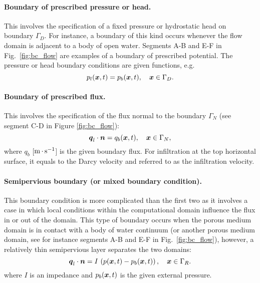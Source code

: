 \paragraph{Boundary of prescribed pressure or head.}
This involves the specification of a fixed pressure or hydrostatic head on boundary $\Gamma_D$.
For instance, a boundary of this kind occurs whenever the flow domain is adjacent to a body of open water.
Segments A-B and E-F in Fig.~\ref{fig:bc_flow} are examples of a boundary of prescribed potential.
The pressure or head boundary conditions are given functions, e.g.
\begin{equation}
\label{eq:BC pressure Darcy PS}
  p_l({\boldsymbol{x}},t) = p_{b}({\boldsymbol{x}},t), \quad {\boldsymbol{x}} \in \Gamma_D. 
\end{equation}

\paragraph{Boundary of prescribed flux.}
This involves the specification of the flux normal to the boundary $\Gamma_N$
(see segment C-D in Figure \ref{fig:bc_flow}):
\begin{equation}
\label{eq:BC flux Darcy PS}
  {\boldsymbol{q}}_l\cdot \boldsymbol{n} = q_{b}({\boldsymbol{x}},t), \quad {\boldsymbol{x}} \in \Gamma_N,
\end{equation}
where $q_b$ [${\rm m}{\,\cdot\,}{\rm s}^{-1}$] is the given boundary flux. 
For infiltration at the top horizontal surface, it equals to the Darcy velocity
and referred to as the infiltration velocity.

\paragraph{Semipervious boundary (or mixed boundary condition).}
This boundary condition is more complicated than the first two as it involves a case 
in which local conditions within the computational domain influence the flux in or 
out of the domain.
This type of boundary occurs when the porous medium domain is in contact with 
a body of water continuum (or another porous medium domain, see for instance segments 
A-B and E-F in Fig.~\ref{fig:bc_flow}), however, a relatively thin semipervious layer 
separates the two domains:
\begin{equation}
\label{eq:BC semipervious Darcy PS}
  {\boldsymbol{q}}_l \cdot \boldsymbol{n} = I\, \left(p ({\boldsymbol{x}},t) - p_{b}({\boldsymbol{x}},t) \right), \quad {\boldsymbol{x}} \in \Gamma_R.
\end{equation}
where $I$ is an impedance and $p_{b}({\boldsymbol{x}},t)$ is the given external pressure.

